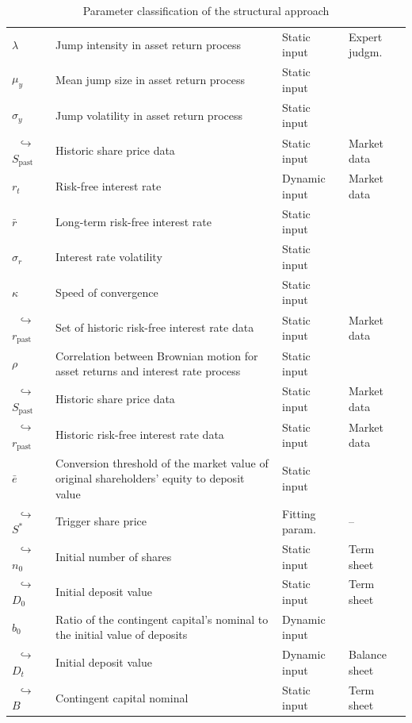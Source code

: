 \begin{table}
\begin{tabular}{p{1.8cm}p{6.8cm}p{2.4cm}p{2.5cm}}
   $\lambda$ & Jump intensity in asset return process & Static input  & Expert judgm.  \\ 
   $\mu_y$ & Mean jump size in asset return process & Static input &  \\
   $\sigma_y$ & Jump volatility in asset return process & Static input &  \\
   $\,\,\,$$\hookrightarrow$ $S_\text{past}$ &  Historic share price data & Static input & Market data\\
   $r_t$ & Risk-free interest rate & Dynamic input & Market data \\
   $\bar{r}$ & Long-term risk-free interest rate & Static input & \\
   $\sigma_r$ &Interest rate volatility & Static input & \\
   $\kappa$ & Speed of convergence & Static input & \\
   $\,\,\,$$\hookrightarrow$ $r_\text{past}$ & Set of historic risk-free interest rate data & Static input & Market data\\
   $\rho$ & Correlation between Brownian motion for asset returns and interest rate process  & Static input & \\ 
   $\,\,\,$$\hookrightarrow$ $S_\text{past}$ &  Historic share price data & Static input & Market data\\
   $\,\,\,$$\hookrightarrow$ $r_\text{past}$ &  Historic risk-free interest rate data & Static input & Market data\\
   $\bar{e}$ & Conversion threshold of the market value of original shareholders' equity to deposit value & Static input & \\
   $\,\,\,$$\hookrightarrow$ $S^*$ & Trigger share price & Fitting param. & -- \\
   $\,\,\,$$\hookrightarrow$ $n_0$ & Initial number of shares & Static input & Term sheet\\
   $\,\,\,$$\hookrightarrow$ $D_0$ & Initial deposit value & Static input & Term sheet\\
   $b_0$ & Ratio of the contingent capital's nominal to the initial value of deposits & Dynamic input & \\
   $\,\,\,$$\hookrightarrow$ $D_t$ & Initial deposit value & Dynamic input & Balance sheet \\
   $\,\,\,$$\hookrightarrow$ $B$ & Contingent capital nominal & Static input & Term sheet\\
  \bottomrule
 \end{tabular}
 \caption[Parameter classification of the structural approach]{Parameter classification of the structural approach}
 \label{tbl:structuralapproachdata}
\end{table}

